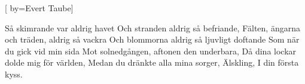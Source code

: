 


[ 	%
	by={Evert Taube}]		%
	
\beginverse*		%
Så skimrande var aldrig havet
Och stranden aldrig så befriande, 
Fälten, ängarna och träden, aldrig så vackra
Och blommorna aldrig så ljuvligt doftande
Som när du gick vid min sida
Mot solnedgången, aftonen den underbara, 
Då dina lockar dolde mig för världen, 
Medan du dränkte alla mina sorger, 
Älskling, 
I din första kyss.
\endverse			%
\endsong			%
